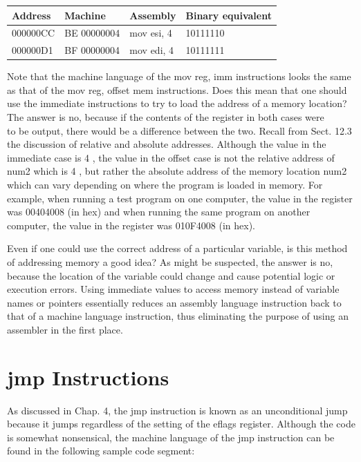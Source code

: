 \documentclass[10pt]{book}
\begin{document}
\begin{center}
\begin{tabular}{|l|l|l|l|}
\hline
Address & Machine & Assembly & Binary equivalent \\
\hline
000000CC & BE 00000004 & mov esi, 4 & 10111110 \\
\hline
000000D1 & BF 00000004 & mov edi, 4 & 10111111 \\
\hline
\end{tabular}
\end{center}

Note that the machine language of the mov reg, imm instructions looks the same as that of the mov reg, offset mem instructions. Does this mean that one should use the immediate instructions to try to load the address of a memory location? The answer is no, because if the contents of the register in both cases were\\
to be output, there would be a difference between the two. Recall from Sect. 12.3 the discussion of relative and absolute addresses. Although the value in the immediate case is 4 , the value in the offset case is not the relative address of num2 which is 4 , but rather the absolute address of the memory location num2 which can vary depending on where the program is loaded in memory. For example, when running a test program on one computer, the value in the register was 00404008 (in hex) and when running the same program on another computer, the value in the register was 010F4008 (in hex).


Even if one could use the correct address of a particular variable, is this method of addressing memory a good idea? As might be suspected, the answer is no, because the location of the variable could change and cause potential logic or execution errors. Using immediate values to access memory instead of variable names or pointers essentially reduces an assembly language instruction back to that of a machine language instruction, thus eliminating the purpose of using an assembler in the first place.

\section{jmp Instructions}
As discussed in Chap. 4, the jmp instruction is known as an unconditional jump because it jumps regardless of the setting of the eflags register. Although the code is somewhat nonsensical, the machine language of the jmp instruction can be found in the following sample code segment:
\end{document}
